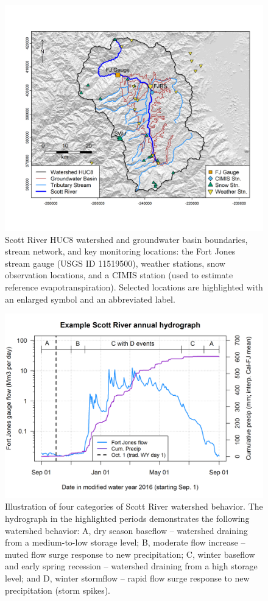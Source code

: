 \documentclass[hess, manuscript]{copernicus}
\begin{document}
\begin{figure}
\includegraphics[width=1\linewidth]{f01} \caption{\label{fig:watershed_fig_ch3} Scott River HUC8 watershed and groundwater basin boundaries, stream network, and key monitoring locations: the Fort Jones stream gauge (USGS ID 11519500), weather stations, snow observation locations, and a CIMIS station (used to estimate reference evapotranspiration). Selected locations are highlighted with an enlarged symbol and an abbreviated label.}\label{fig:watershed_fig_ch3}
\end{figure}

\begin{figure}
\includegraphics[width=1\linewidth]{f02} \caption{\label{fig:watershed_4states_illustration} Illustration of four categories of Scott River watershed behavior. The hydrograph in the highlighted periods demonstrates the following watershed behavior: A, dry season baseflow -- watershed draining from a medium-to-low storage level; B, moderate flow increase  -- muted flow surge response to new precipitation; C, winter baseflow and early spring recession -- watershed draining from a high storage level; and D, winter stormflow -- rapid flow surge response to new precipitation (storm spikes).}\label{fig:watershed_4states_illustration}
\end{figure}
\end{document}
